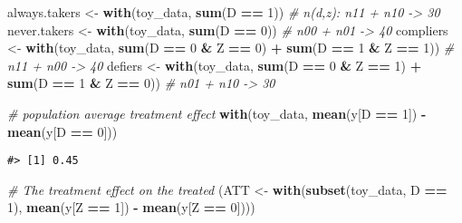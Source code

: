\documentclass[
]{article}
\newenvironment{Shaded}{\begin{snugshade}}{\end{snugshade}}
\newcommand{\CommentTok}[1]{\textcolor[rgb]{0.56,0.35,0.01}{\textit{#1}}}
\newcommand{\DecValTok}[1]{\textcolor[rgb]{0.00,0.00,0.81}{#1}}
\newcommand{\KeywordTok}[1]{\textcolor[rgb]{0.13,0.29,0.53}{\textbf{#1}}}
\newcommand{\NormalTok}[1]{#1}
\newcommand{\OperatorTok}[1]{\textcolor[rgb]{0.81,0.36,0.00}{\textbf{#1}}}
\newcommand{\StringTok}[1]{\textcolor[rgb]{0.31,0.60,0.02}{#1}}
\begin{document}
\begin{Shaded}
\begin{Highlighting}[]
\NormalTok{always.takers \textless{}{-}}\StringTok{ }\KeywordTok{with}\NormalTok{(toy\_data, }\KeywordTok{sum}\NormalTok{(D }\OperatorTok{==}\StringTok{ }\DecValTok{1}\NormalTok{)) }\CommentTok{\# n(d,z): n11 + n10 {-}\textgreater{} 30}
\NormalTok{never.takers \textless{}{-}}\StringTok{ }\KeywordTok{with}\NormalTok{(toy\_data, }\KeywordTok{sum}\NormalTok{(D }\OperatorTok{==}\StringTok{ }\DecValTok{0}\NormalTok{)) }\CommentTok{\# n00 + n01  {-}\textgreater{} 40}
\NormalTok{compliers \textless{}{-}}\StringTok{ }\KeywordTok{with}\NormalTok{(toy\_data, }
                  \KeywordTok{sum}\NormalTok{(D }\OperatorTok{==}\StringTok{ }\DecValTok{0} \OperatorTok{\&}\StringTok{ }\NormalTok{Z }\OperatorTok{==}\StringTok{ }\DecValTok{0}\NormalTok{) }\OperatorTok{+}\StringTok{ }
\StringTok{                    }\KeywordTok{sum}\NormalTok{(D }\OperatorTok{==}\StringTok{ }\DecValTok{1} \OperatorTok{\&}\StringTok{ }\NormalTok{Z }\OperatorTok{==}\StringTok{ }\DecValTok{1}\NormalTok{)) }\CommentTok{\# n11 + n00 {-}\textgreater{} 40}
\NormalTok{defiers \textless{}{-}}\StringTok{ }\KeywordTok{with}\NormalTok{(toy\_data, }
                \KeywordTok{sum}\NormalTok{(D }\OperatorTok{==}\StringTok{ }\DecValTok{0} \OperatorTok{\&}\StringTok{ }\NormalTok{Z }\OperatorTok{==}\StringTok{ }\DecValTok{1}\NormalTok{) }\OperatorTok{+}\StringTok{ }
\StringTok{                  }\KeywordTok{sum}\NormalTok{(D }\OperatorTok{==}\StringTok{ }\DecValTok{1} \OperatorTok{\&}\StringTok{ }\NormalTok{Z }\OperatorTok{==}\StringTok{ }\DecValTok{0}\NormalTok{)) }\CommentTok{\# n01 + n10 {-}\textgreater{} 30}

\CommentTok{\# population average treatment effect}
\KeywordTok{with}\NormalTok{(toy\_data, }\KeywordTok{mean}\NormalTok{(y[D }\OperatorTok{==}\StringTok{ }\DecValTok{1}\NormalTok{]) }\OperatorTok{{-}}\StringTok{ }\KeywordTok{mean}\NormalTok{(y[D }\OperatorTok{==}\StringTok{ }\DecValTok{0}\NormalTok{]))}
\end{Highlighting}
\end{Shaded}

\begin{verbatim}
#> [1] 0.45
\end{verbatim}

\begin{Shaded}
\begin{Highlighting}[]
\CommentTok{\# The treatment effect on the treated}
\NormalTok{(ATT \textless{}{-}}\StringTok{ }\KeywordTok{with}\NormalTok{(}\KeywordTok{subset}\NormalTok{(toy\_data, D }\OperatorTok{==}\StringTok{ }\DecValTok{1}\NormalTok{), }
             \KeywordTok{mean}\NormalTok{(y[Z }\OperatorTok{==}\StringTok{ }\DecValTok{1}\NormalTok{]) }\OperatorTok{{-}}\StringTok{ }\KeywordTok{mean}\NormalTok{(y[Z }\OperatorTok{==}\StringTok{ }\DecValTok{0}\NormalTok{])))}
\end{Highlighting}
\end{Shaded}
\end{document}
